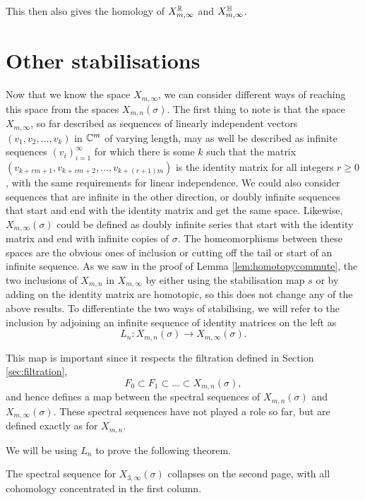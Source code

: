 This then also gives the homology of $X_{m,\infty}^{\mathbb{R}}$ and
$X_{m,\infty}^{\mathbb{H}}$.


\section{Other stabilisations}
\label{sec:stabilitet}

Now that we know the space $X_{m,\infty}$, we can consider different
ways of reaching this space from the spaces $X_{m,n}(\sigma)$. The
first thing to note is that the space $X_{m,\infty}$, so far described
as sequences of linearly independent vectors $(v_1,v_2,\dots,v_k)$ in
$\mathbb{C}^m$ of varying length, may as well be described as infinite
sequences $(v_i)_{i=1}^\infty$ for which there is some $k$ such that
the matrix $(v_{k+rm +1},v_{k+rm +2},\dots,v_{k+(r+1)m})$ is the
identity matrix for all integers $r \geq 0$, with the same
requirements for
linear independence. We could also consider sequences that are
infinite in the other direction, or
doubly infinite sequences
that start and end with the identity matrix
and get the same space. Likewise, $X_{m,\infty}(\sigma)$ could be
defined as doubly infinite series that start with the identity matrix
and end with infinite copies of $\sigma$. The homeomorphisms between
these spaces are the obvious ones of inclusion or cutting off the tail
or start of an infinite sequence. As we saw in the proof of Lemma
\ref{lem:homotopycommute}, the two inclusions of $X_{m,n}$ in
$X_{m,\infty}$ by either
using the stabilisation map $s$ or by adding on the identity matrix
are homotopic, so this does not change any of the above results. To
differentiate the two ways of stabilising, we will refer to the
inclusion by adjoining an
infinite sequence of identity matrices on the left as
\[ L_n : X_{m,n}(\sigma) \to X_{m,\infty}(\sigma). \]

This map is important since it respects the
filtration defined in Section \ref{sec:filtration},
\[ F_0 \subset F_1 \subset \dots \subset X_{m,n}(\sigma), \]
and hence defines a map between the spectral sequences of
$X_{m,n}(\sigma)$ and $X_{m,\infty}(\sigma)$. These spectral sequences
have not played a role so far, but are defined exactly as for
$X_{m,n}$.

We will be using $L_n$ to prove the following theorem.
\begin{theorem}
  \label{thm:kollaps}
  The spectral sequence for $X_{3,\infty}(\sigma)$ collapses on the
  second page, with all cohomology concentrated in the first column.
\end{theorem}

